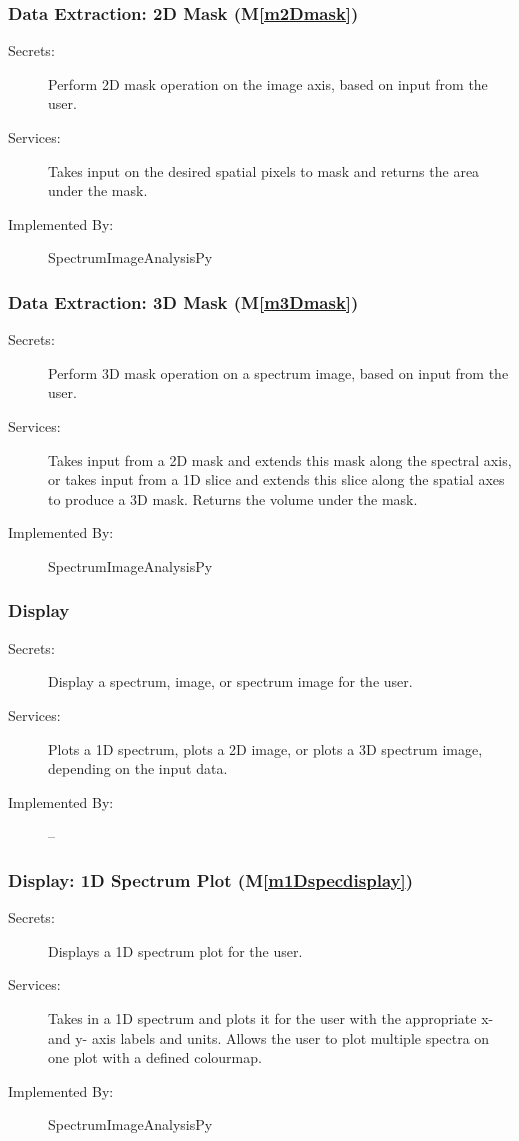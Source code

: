 \documentclass[12pt, titlepage]{article}
\newcommand{\mref}[1]{M\ref{#1}}
\newcommand{\progname}{SpectrumImageAnalysisPy}
\begin{document}
\subsubsection{Data Extraction: 2D Mask (\mref{m2Dmask})}
\label{sssec:Extract2D}
\begin{description}
	\item[Secrets:]Perform 2D mask operation on the image axis, based on input from
the user.
	\item[Services:]Takes input on the desired spatial pixels to mask and returns
the area under the mask.
	\item[Implemented By:] \progname
\end{description}

\subsubsection{Data Extraction: 3D Mask (\mref{m3Dmask})}
\label{sssec:Extract3D}
\begin{description}
	\item[Secrets:]Perform 3D mask operation on a spectrum image, based on input
from the user.
	\item[Services:]Takes input from a 2D mask and extends this mask along the
spectral axis, or takes input from a 1D slice and extends this slice along the
spatial axes to produce a 3D mask. Returns the volume under the mask.
	\item[Implemented By:] \progname
\end{description}

\subsubsection{Display}
\label{sssec:Display}
\begin{description}
	\item[Secrets:]Display a spectrum, image, or spectrum image for the user.
	\item[Services:]Plots a 1D spectrum, plots a 2D image, or plots a 3D spectrum
image, depending on the input data. 
	\item[Implemented By:] --
\end{description}

\subsubsection{Display: 1D Spectrum Plot (\mref{m1Dspecdisplay})}
\label{sssec:Plot1D}
\begin{description}
	\item[Secrets:]Displays a 1D spectrum plot for the user.
	\item[Services:]Takes in a 1D spectrum and plots it for the user with the
appropriate x- and y- axis labels and units. Allows the user to plot multiple
spectra on one plot with a defined colourmap.
	\item[Implemented By:] \progname
\end{description}
\end{document}
